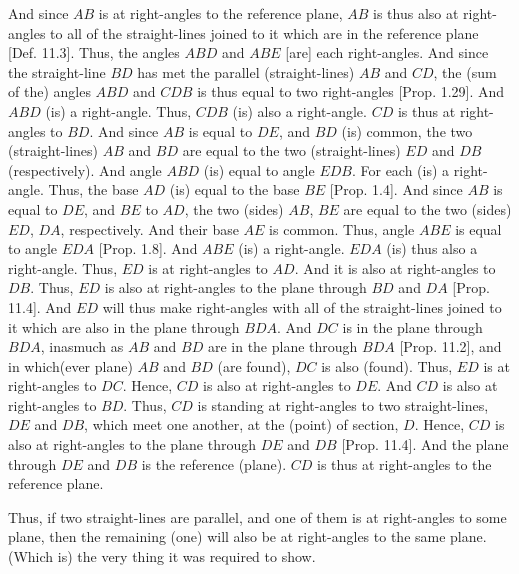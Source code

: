 \begin{Parallel}{}{}
{And since $AB$ is at right-angles to the reference plane, $AB$ is thus also
at right-angles to all of the straight-lines joined to it which are in the
reference plane [Def. 11.3].  Thus, the angles $ABD$ and $ABE$ [are] each right-angles. And since the straight-line $BD$ has
met the parallel (straight-lines) $AB$ and $CD$, the (sum of the) angles
$ABD$ and $CDB$ is thus equal to two right-angles [Prop. 1.29]. And $ABD$ (is) a right-angle. Thus, $CDB$ (is)
also a right-angle. $CD$ is thus at right-angles to $BD$. And since $AB$
is equal to $DE$, and $BD$ (is) common, the two (straight-lines) $AB$ and
$BD$ are equal to the two (straight-lines) $ED$ and $DB$ (respectively). And angle
$ABD$ (is) equal to angle $EDB$. For each (is) a right-angle.
Thus, the base $AD$ (is) equal to the base $BE$ [Prop. 1.4]. And since $AB$ is equal to $DE$, and $BE$ to $AD$, 
the two (sides) $AB$, $BE$ are equal to the two (sides) $ED$, $DA$,
respectively. And their base $AE$ is common. Thus, angle $ABE$ is equal to
angle $EDA$ [Prop. 1.8]. And $ABE$ (is) a
right-angle. $EDA$ (is) thus also a right-angle. Thus, $ED$ is
at right-angles to $AD$. And it is also at right-angles to $DB$. Thus, $ED$
is also at right-angles to the plane through $BD$ and $DA$ [Prop. 11.4]. And $ED$ will thus  make right-angles
with all of the straight-lines joined to it which are also in the plane through
$BDA$. And $DC$ is in the plane through $BDA$, inasmuch as
$AB$ and $BD$ are in the plane through $BDA$ [Prop. 11.2], and in which(ever plane)
$AB$ and $BD$ (are found), $DC$ is also (found). Thus, $ED$ is at right-angles to $DC$. Hence, $CD$ is also at right-angles to $DE$. And
$CD$ is also at right-angles to $BD$. Thus, $CD$ is standing  at right-angles
to two straight-lines, $DE$ and $DB$, which meet one another, at the 
(point) of section, $D$. Hence, $CD$ is also at
right-angles to the plane through $DE$ and $DB$ [Prop. 11.4]. And the plane through $DE$ and $DB$ is the reference
(plane). $CD$ is thus at right-angles to the reference plane.

Thus, if  two  straight-lines are parallel, and one of them is at right-angles to some plane, then the remaining (one) will also
be at right-angles to the same plane. (Which is) the very thing it was required to show.}
\end{Parallel}

